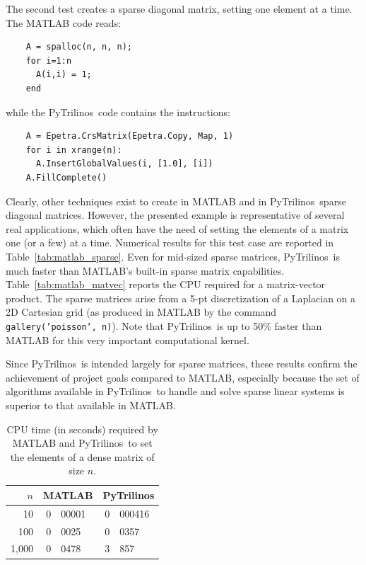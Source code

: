 \documentclass[acmtocl]{acmtrans2m}
\newcommand{\PyTrilinos}{{PyTrilinos}}
\begin{document}
The second test creates a sparse diagonal matrix, setting one element
at a time.  The MATLAB code reads:
\begin{verbatim}
    A = spalloc(n, n, n);
    for i=1:n
      A(i,i) = 1;
    end
\end{verbatim}
while the \PyTrilinos\ code contains the instructions:
\begin{verbatim}
    A = Epetra.CrsMatrix(Epetra.Copy, Map, 1)
    for i in xrange(n):
      A.InsertGlobalValues(i, [1.0], [i])
    A.FillComplete()
\end{verbatim}
Clearly, other techniques exist to create in MATLAB and in
\PyTrilinos\ sparse diagonal matrices.  However, the presented example
is representative of several real applications, which often have the
need of setting the elements of a matrix one (or a few) at a time.
Numerical results for this test case are reported in
Table~\ref{tab:matlab_sparse}.  Even for mid-sized sparse matrices,
\PyTrilinos\ is much faster than MATLAB's built-in sparse matrix
capabilities.  Table~\ref{tab:matlab_matvec} reports the CPU required
for a matrix-vector product.  The sparse matrices arise from a 5-pt
discretization of a Laplacian on a 2D Cartesian grid (as produced in
MATLAB by the command {\tt gallery('poisson', n)}).  Note that
\PyTrilinos\ is up to 50\% faster than MATLAB for this very important
computational kernel.

Since \PyTrilinos\ is intended largely for sparse matrices, these
results confirm the achievement of project goals compared to MATLAB,
especially because the set of algorithms available in \PyTrilinos\ to
handle and solve sparse linear systems is superior to that available
in MATLAB.

\begin{table}
  \begin{center}
    \begin{tabular}{|r|r@{.}l|r@{.}l|}
      \hline
      $n$ & \multicolumn{2}{c|}{MATLAB} &
      \multicolumn{2}{c|}{PyTrilinos} \\
      \hline
      \hline
         10  & 0&00001 & 0&000416 \\
        100  & 0&0025  & 0&0357   \\
      1,000  & 0&0478  & 3&857    \\
      \hline
    \end{tabular}
    \caption{CPU time (in seconds) required by MATLAB and
      \PyTrilinos\ to set the elements of a dense matrix of size $n$.}
    \label{tab:matlab_dense}
  \end{center}
\end{table}
\end{document}
